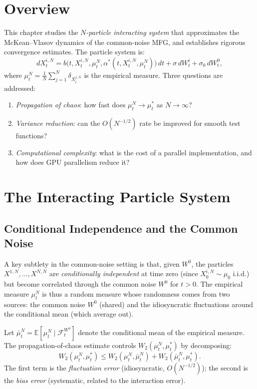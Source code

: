 
\section{Overview}

This chapter studies the \emph{$N$-particle interacting system} that approximates
the McKean--Vlasov dynamics of the common-noise MFG, and establishes rigorous
convergence estimates. The particle system is:
\begin{equation}
    dX_t^{i,N} = b\big(t, X_t^{i,N}, \mu_t^N, \alpha^*(t, X_t^{i,N}, \mu_t^N)
    \big)\, dt + \sigma\, dW_t^i + \sigma_0\, dW_t^0,
    \label{eq:particle-system}
\end{equation}
where $\mu_t^N = \frac{1}{N}\sum_{j=1}^N \delta_{X_t^{j,N}}$ is the empirical
measure. Three questions are addressed:
\begin{enumerate}
    \item \emph{Propagation of chaos}: how fast does $\mu_t^N \to \mu_t^*$ as
    $N \to \infty$?
    \item \emph{Variance reduction}: can the $O(N^{-1/2})$ rate be improved for
    smooth test functions?
    \item \emph{Computational complexity}: what is the cost of a parallel
    implementation, and how does GPU parallelism reduce it?
\end{enumerate}

\section{The Interacting Particle System}

\subsection{Conditional Independence and the Common Noise}

A key subtlety in the common-noise setting is that, given $W^0$, the particles
$X^{1,N}, \ldots, X^{N,N}$ are \emph{conditionally independent} at time zero
(since $X_0^{i,N} \sim \mu_0$ i.i.d.) but become correlated through the common
noise $W^0$ for $t > 0$. The empirical measure $\mu_t^N$ is thus a random measure
whose randomness comes from two sources: the common noise $W^0$ (shared) and the
idiosyncratic fluctuations around the conditional mean (which average out).

Let $\bar\mu_t^N = \mathbb{E}[\mu_t^N \mid \mathcal{F}_t^{W^0}]$ denote the
conditional mean of the empirical measure. The propagation-of-chaos estimate
controls $W_2(\mu_t^N, \mu_t^*)$ by decomposing:
\begin{equation}
    W_2(\mu_t^N, \mu_t^*) \le W_2(\mu_t^N, \bar\mu_t^N) +
    W_2(\bar\mu_t^N, \mu_t^*).
    \label{eq:wasserstein-decomposition}
\end{equation}
The first term is the \emph{fluctuation error} (idiosyncratic, $O(N^{-1/2})$); the
second is the \emph{bias error} (systematic, related to the interaction error).

